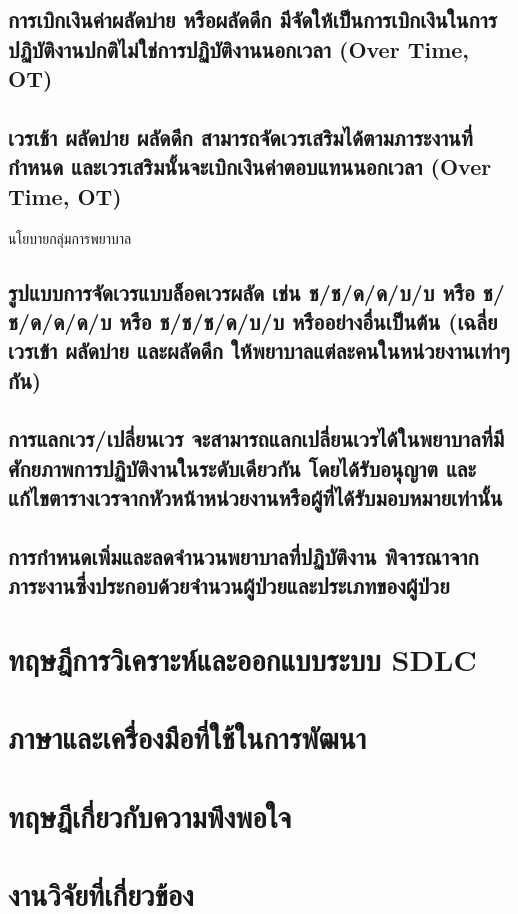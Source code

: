 \hspace{0.5cm}\hangindent=2.7cm\subsection{การเบิกเงินค่าผลัดบ่าย หรือผลัดดึก มีจัดให้เป็นการเบิกเงินในการปฏิบัติงานปกติไม่ใช่การปฏิบัติงานนอกเวลา (Over Time, OT)}

\hspace{0.5cm}\hangindent=2.7cm\subsection{เวรเช้า ผลัดบ่าย ผลัดดึก สามารถจัดเวรเสริมได้ตามภาระงานที่กำหนด และเวรเสริมนั้นจะเบิกเงินค่าตอบแทนนอกเวลา (Over Time, OT)}

\clearpage

นโยบายกลุ่มการพยาบาล

\hspace{1cm}{เป็นนโยบายในการจัดเวรผลัดของพยาบาลวิชาชีพ พยาบาลเทคนิค ผู้ช่วยพยาบาล สำหรับทุกหน่วยงานให้ถือปฏิบัติ เพื่อความเป็นธรรมแก่พยาบาลและความปลอดภัยของผู้ป่วย ได้แก่}

\hspace{0.5cm}\hangindent=2.7cm\subsection{รูปแบบการจัดเวรแบบล็อคเวรผลัด เช่น ช/ช/ด/ด/บ/บ หรือ ช/ช/ด/ด/ด/บ หรือ ช/ช/ช/ด/บ/บ หรืออย่างอื่นเป็นต้น (เฉลี่ยเวรเข้า ผลัดบ่าย และผลัดดึก ให้พยาบาลแต่ละคนในหน่วยงานเท่าๆกัน)}

\hspace{0.5cm}\hangindent=2.7cm\subsection{การแลกเวร/เปลี่ยนเวร จะสามารถแลกเปลี่ยนเวรได้ในพยาบาลที่มีศักยภาพการปฏิบัติงานในระดับเดียวกัน โดยได้รับอนุญาต และแก้ไขตารางเวรจากหัวหน้าหน่วยงานหรือผู้ที่ได้รับมอบหมายเท่านั้น}

\hspace{0.5cm}\hangindent=2.7cm\subsection{การกำหนดเพิ่มและลดจำนวนพยาบาลที่ปฏิบัติงาน พิจารณาจากภาระงานซึ่งประกอบด้วยจำนวนผู้ป่วยและประเภทของผู้ป่วย}

\section{ทฤษฎีการวิเคราะห์และออกแบบระบบ SDLC}

\section{ภาษาและเครื่องมือที่ใช้ในการพัฒนา}

\section{ทฤษฎีเกี่ยวกับความพึงพอใจ}

\section{งานวิจัยที่เกี่ยวข้อง}

